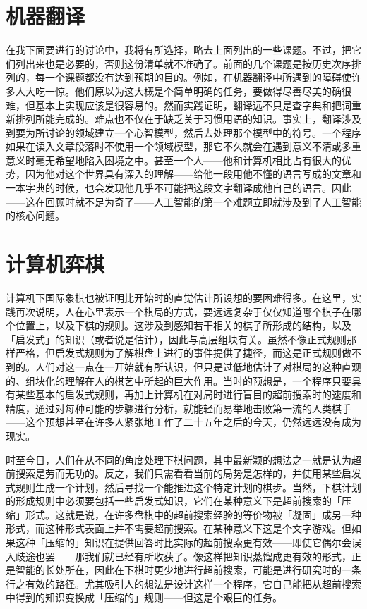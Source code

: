 \documentclass[
  12pt,
  twoside,
  openright,
  oldfontcommands,
]{memoir}
\begin{document}
\section{机器翻译}

在我下面要进行的讨论中，我将有所选择，略去上面列出的一些课题。不过，把它们列出来也是必要的，否则这份清单就不准确了。前面的几个课题是按历史次序排列的，每一个课题都没有达到预期的目的。例如，在机器翻译中所遇到的障碍使许多人大吃一惊。他们原以为这大概是个简单明确的任务，要做得尽善尽美的确很难，但基本上实现应该是很容易的。然而实践证明，翻译远不只是查字典和把词重新排列所能完成的。难点也不仅在于缺乏关于习惯用语的知识。事实上，翻译涉及到要为所讨论的领域建立一个心智模型，然后去处理那个模型中的符号。一个程序如果在读入文章段落时不使用一个领域模型，那它不久就会在遇到意义不清或多重意义时毫无希望地陷入困境之中。甚至一个人------他和计算机相比占有很大的优势，因为他对这个世界具有深入的理解------给他一段用他不懂的语言写成的文章和一本字典的时候，也会发现他几乎不可能把这段文字翻译成他自己的语言。因此------这在回顾时就不足为奇了------人工智能的第一个难题立即就涉及到了人工智能的核心问题。

\section{计算机弈棋}

计算机下国际象棋也被证明比开始时的直觉估计所设想的要困难得多。在这里，实践再次说明，人在心里表示一个棋局的方式，要远远复杂于仅仅知道哪个棋子在哪个位置上，以及下棋的规则。这涉及到感知若干相关的棋子所形成的结构，以及「启发式」的知识（或者说是估计），因此与高层组块有关。虽然不像正式规则那样严格，但启发式规则为了解棋盘上进行的事件提供了捷径，而这是正式规则做不到的。人们对这一点在一开始就有所认识，但只是过低地估计了对棋局的这种直观的、组块化的理解在人的棋艺中所起的巨大作用。当时的预想是，一个程序只要具有某些基本的启发式规则，再加上计算机在对局时进行盲目的超前搜索时的速度和精度，通过对每种可能的步骤进行分析，就能轻而易举地击败第一流的人类棋手------这个预想甚至在许多人紧张地工作了二十五年之后的今天，仍然远远没有成为现实。

时至今日，人们在从不同的角度处理下棋问题，其中最新颖的想法之一就是认为超前搜索是劳而无功的。反之，我们只需看看当前的局势是怎样的，并使用某些启发式规则生成一个计划，然后寻找一个能推进这个特定计划的棋步。当然，下棋计划的形成规则中必须要包括一些启发式知识，它们在某种意义下是超前搜索的「压缩」形式。这就是说，在许多盘棋中的超前搜索经验的等价物被「凝固」成另一种形式，而这种形式表面上并不需要超前搜索。在某种意义下这是个文字游戏。但如果这种「压缩的」知识在提供回答时比实际的超前搜索更有效------即使它偶尔会误入歧途也罢------那我们就已经有所收获了。像这样把知识蒸馏成更有效的形式，正是智能的长处所在，因此在下棋时更少地进行超前搜索，可能是进行研究时的一条行之有效的路径。尤其吸引人的想法是设计这样一个程序，它自己能把从超前搜索中得到的知识变换成「压缩的」规则------但这是个艰巨的任务。
\end{document}
